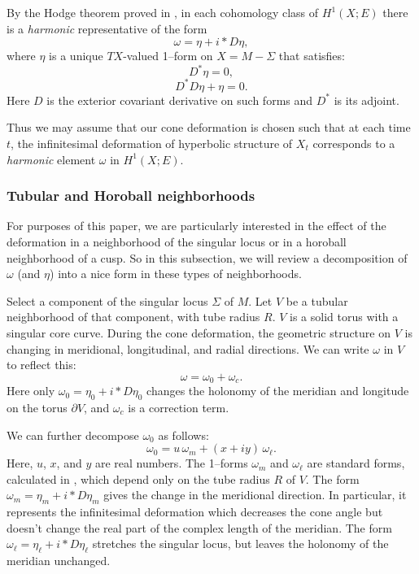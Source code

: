 By the {H}odge theorem proved in \cite{hk:cone-rigid}, in each
cohomology class of $H^1(X;E)$ there is a \emph{harmonic}
representative of the form
$$\omega = \eta + i*D\eta,$$
where $\eta$ is a unique $TX$-valued
1--form on $X = M-\Sigma$ that satisfies:
$$D^*\eta=0,$$
\begin{equation}
D^*D\eta + \eta =0.
\label{eqn:d*deta}
\end{equation}
Here $D$ is the exterior covariant derivative on such forms and $D^*$
is its adjoint.

Thus we may assume that our cone deformation is chosen such that at
each time $t$, the infinitesimal deformation of hyperbolic structure
of $X_t$ corresponds to a \emph{harmonic} element $\omega$ in
$H^1(X;E)$.

\subsubsection{Tubular and Horoball neighborhoods}

For purposes of this paper, we are particularly interested in the
effect of the deformation in a neighborhood of the singular locus or
in a horoball neighborhood of a cusp.  So in this subsection, we will
review a decomposition of $\omega$ (and $\eta$) into a nice form in
these types of neighborhoods.

Select a component of the singular locus $\Sigma$ of $M$.  Let $V$ be
a tubular neighborhood of that component, with tube radius $R$.  $V$
is a solid torus with a singular core curve.  During the cone
deformation, the geometric structure on $V$ is changing in meridional,
longitudinal, and radial directions.  We can write $\omega$ in $V$ to
reflect this:
\begin{equation}
\omega = \omega_0 + \omega_c.
\label{eqn:omega-decomp}
\end{equation}
Here only $\omega_0 = \eta_0 + i*D\eta_0$
changes the holonomy of the meridian and longitude on the torus
$\partial V$, and $\omega_c$ is a correction term.

We can further decompose $\omega_0$ as follows:
\begin{equation}
\omega_0 = u\, \omega_m + (x+iy)\,\omega_\ell.
\label{eqn:omega_0-decomp}
\end{equation}
Here, $u$, $x$, and $y$ are real numbers.  The 1--forms $\omega_m$ and
$\omega_\ell$ are standard forms, calculated in \cite{hk:cone-rigid},
which depend only on the tube radius $R$ of $V$.  The form $\omega_m =
\eta_m + i*D\eta_m$ gives the change in the meridional direction.  In
particular, it represents the infinitesimal deformation which
decreases the cone angle but doesn't change the real part of the
complex length of the meridian.  The form $\omega_\ell = \eta_\ell
+i*D\eta_\ell$ stretches the singular locus, but leaves the holonomy
of the meridian unchanged.

